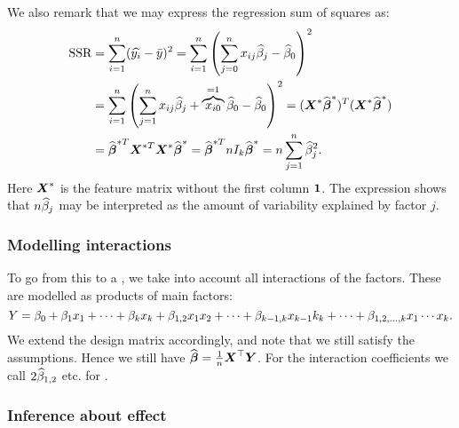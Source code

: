 We also remark that we may express the regression sum of squares as:
\begin{align*}
    \textrm{SSR} 
    &= \sum_{i=1}^{n} (\widehat{y_i} - \bar{y})^2 
    = \sum_{i=1}^{n} \left( \sum_{j=0}^{n} x_{ij} \widehat{\beta}_j - \widehat{\beta}_0 \right)^2 
    \\&= \sum_{i=1}^{n} \left( \sum_{j=1}^{n} x_{ij} \widehat{\beta}_j + \overbrace{x_{i0}}^{=1} \widehat{\beta}_0 - \widehat{\beta}_0 \right)^2
    = (\boldsymbol{X}^* \widehat{\boldsymbol{\beta}}^*)^T (\boldsymbol{X}^* \widehat{\boldsymbol{\beta}}^*)
    \\&= \widehat{\boldsymbol{\beta}}^{*T} \boldsymbol{X}^{*T} \boldsymbol{X}^* \widehat{\boldsymbol{\beta}}^* 
    = \widehat{\boldsymbol{\beta}}^{*T} n I_k \widehat{\boldsymbol{\beta}}^* 
    = n \sum_{j=1}^{n} \widehat{\beta}_j^2.
\end{align*}
Here $\boldsymbol{X}^*$ is the feature matrix without the first column $\boldsymbol{1}$. The expression shows that $n\widehat{\beta}_j$ may be interpreted as the amount of variability explained by factor $j$.

\subsubsection{Modelling interactions}

To go from this to a , we take into account all interactions of the factors. These are modelled as products of main factors:
$$
    Y = \beta_0 + \beta_1x_1+\dots+\beta_kx_k + \beta_{1,2}x_1x_2 + \dots+\beta_{k-1,k}x_{k-1}k_{k}+\dots+\beta_{1,2,\dots,k}x_1\cdots x_k.
$$
We extend the design matrix accordingly, and note that we still satisfy the assumptions. Hence we still have $\widehat{\boldsymbol{\beta}} = \frac{1}{n}\boldsymbol{X}^\top\boldsymbol{Y}$. For the interaction coefficients we call $2\widehat{\beta}_{1,2}$ etc. for . 

\subsubsection{Inference about effect}

